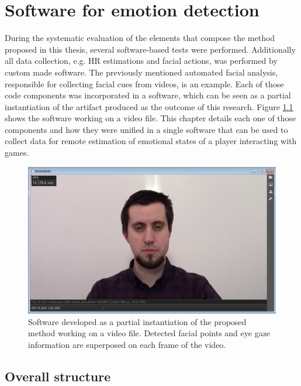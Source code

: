 \chapter{Software for emotion detection}
\label{ch:software}

During the systematic evaluation of the elements that compose the method proposed in this thesis, several software-based tests were performed. Additionally all data collection, e.g. HR estimations and facial actions, was performed by custom made software. The previously mentioned automated facial analysis, responsible for collecting facial cues from videos, is an example. Each of those code components was incorporated in a software, which can be seen as a partial instantiation of the artifact produced as the outcome of this research. Figure \ref{fig:readmind-main-window} shows the software working on a video file. This chapter details each one of those components and how they were unified in a single software that can be used to collect data for remote estimation of emotional states of a player interacting with games.

\begin{figure}[h!]
    \centering
    \includegraphics[width=\textwidth]{Content/figures/tool-main-window.png}
    \caption{Software developed as a partial instantiation of the proposed method working on a video file. Detected facial points and eye gaze information are superposed on each frame of the video.}
    \label{fig:readmind-main-window}
\end{figure}

\section{Overall structure}

